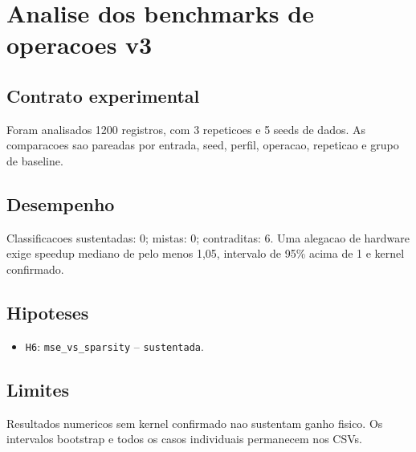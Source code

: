 \chapter{Analise dos benchmarks de operacoes v3}
\section{Contrato experimental}
Foram analisados 1200 registros, com 3 repeticoes e 5 seeds de dados.
As comparacoes sao pareadas por entrada, seed, perfil, operacao, repeticao e grupo de baseline.
\section{Desempenho}
Classificacoes sustentadas: 0; mistas: 0; contraditas: 6.
Uma alegacao de hardware exige speedup mediano de pelo menos 1,05, intervalo de 95\% acima de 1 e kernel confirmado.
\section{Hipoteses}
\begin{itemize}
\item \texttt{H6}: \texttt{mse\_vs\_sparsity} -- \texttt{sustentada}.
\end{itemize}
\section{Limites}
Resultados numericos sem kernel confirmado nao sustentam ganho fisico. Os intervalos bootstrap e todos os casos individuais permanecem nos CSVs.
